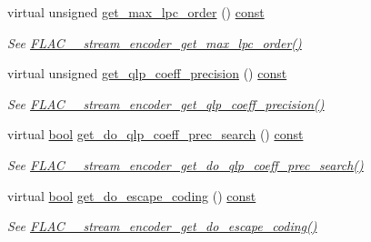 \begin{DoxyCompactItemize}
virtual unsigned \hyperlink{class_f_l_a_c_1_1_encoder_1_1_stream_a42f9dd263aed9bbf59a7c5a1e5bd3176}{get\+\_\+max\+\_\+lpc\+\_\+order} () \hyperlink{getopt1_8c_a2c212835823e3c54a8ab6d95c652660e}{const} 
\begin{DoxyCompactList}\small\item\em See \hyperlink{group__flac__stream__encoder_ga283e0a80301d38295242f9b57ade15cf}{F\+L\+A\+C\+\_\+\+\_\+stream\+\_\+encoder\+\_\+get\+\_\+max\+\_\+lpc\+\_\+order()} \end{DoxyCompactList}\item 
virtual unsigned \hyperlink{class_f_l_a_c_1_1_encoder_1_1_stream_a691e7616f853d0bdfd27d7ec899d2339}{get\+\_\+qlp\+\_\+coeff\+\_\+precision} () \hyperlink{getopt1_8c_a2c212835823e3c54a8ab6d95c652660e}{const} 
\begin{DoxyCompactList}\small\item\em See \hyperlink{group__flac__stream__encoder_ga40ae31529071b3be2f39968d4265c663}{F\+L\+A\+C\+\_\+\+\_\+stream\+\_\+encoder\+\_\+get\+\_\+qlp\+\_\+coeff\+\_\+precision()} \end{DoxyCompactList}\item 
virtual \hyperlink{mac_2config_2i386_2lib-src_2libsoxr_2soxr-config_8h_abb452686968e48b67397da5f97445f5b}{bool} \hyperlink{class_f_l_a_c_1_1_encoder_1_1_stream_a00b5b26fec7d69357378e8da9232d391}{get\+\_\+do\+\_\+qlp\+\_\+coeff\+\_\+prec\+\_\+search} () \hyperlink{getopt1_8c_a2c212835823e3c54a8ab6d95c652660e}{const} 
\begin{DoxyCompactList}\small\item\em See \hyperlink{group__flac__stream__encoder_gaa258ce03d970b397f5b698c63636d985}{F\+L\+A\+C\+\_\+\+\_\+stream\+\_\+encoder\+\_\+get\+\_\+do\+\_\+qlp\+\_\+coeff\+\_\+prec\+\_\+search()} \end{DoxyCompactList}\item 
virtual \hyperlink{mac_2config_2i386_2lib-src_2libsoxr_2soxr-config_8h_abb452686968e48b67397da5f97445f5b}{bool} \hyperlink{class_f_l_a_c_1_1_encoder_1_1_stream_a0103e909c02414d31385836252231bfc}{get\+\_\+do\+\_\+escape\+\_\+coding} () \hyperlink{getopt1_8c_a2c212835823e3c54a8ab6d95c652660e}{const} 
\begin{DoxyCompactList}\small\item\em See \hyperlink{group__flac__stream__encoder_ga06a8e154139880a2def5f54b6c2700d6}{F\+L\+A\+C\+\_\+\+\_\+stream\+\_\+encoder\+\_\+get\+\_\+do\+\_\+escape\+\_\+coding()} \end{DoxyCompactList}\item 

\end{DoxyCompactItemize}
